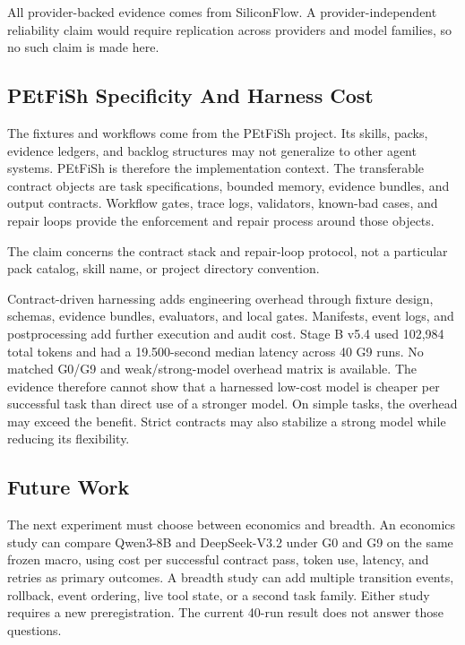 \documentclass[11pt]{article}
\begin{document}
All provider-backed evidence comes from SiliconFlow. A provider-independent reliability claim would require replication across providers and model families, so no such claim is made here.

\subsection{PEtFiSh Specificity And Harness Cost}

The fixtures and workflows come from the PEtFiSh project. Its skills, packs, evidence ledgers, and backlog structures may not generalize to other agent systems. PEtFiSh is therefore the implementation context. The transferable contract objects are task specifications, bounded memory, evidence bundles, and output contracts. Workflow gates, trace logs, validators, known-bad cases, and repair loops provide the enforcement and repair process around those objects.

The claim concerns the contract stack and repair-loop protocol, not a particular pack catalog, skill name, or project directory convention.

Contract-driven harnessing adds engineering overhead through fixture design, schemas, evidence bundles, evaluators, and local gates. Manifests, event logs, and postprocessing add further execution and audit cost. Stage B v5.4 used 102,984 total tokens and had a 19.500-second median latency across 40 G9 runs. No matched G0/G9 and weak/strong-model overhead matrix is available. The evidence therefore cannot show that a harnessed low-cost model is cheaper per successful task than direct use of a stronger model. On simple tasks, the overhead may exceed the benefit. Strict contracts may also stabilize a strong model while reducing its flexibility.

\subsection{Future Work}

The next experiment must choose between economics and breadth. An economics study can compare Qwen3-8B and DeepSeek-V3.2 under G0 and G9 on the same frozen macro, using cost per successful contract pass, token use, latency, and retries as primary outcomes. A breadth study can add multiple transition events, rollback, event ordering, live tool state, or a second task family. Either study requires a new preregistration. The current 40-run result does not answer those questions.
\end{document}
